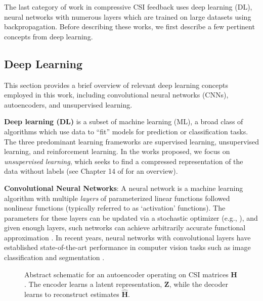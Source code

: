 The last category of work in compressive CSI feedback uses deep learning (DL), neural networks with numerous layers which are trained on large datasets using backpropagation. Before describing these works, we first describe a few pertinent concepts from deep learning.

\subsection{Deep Learning}
\label{sect:dl_overview}

This section provides a brief overview of relevant deep learning concepts employed in this work, including convolutional neural networks (CNNs), autoencoders, and unsupervised learning.

\textbf{Deep learning (DL)} is a subset of machine learning (ML), a broad class of algorithms which use data to ``fit'' models for prediction or classification tasks. The three predominant learning frameworks are supervised learning, unsupervised learning, and reinforcement learning. In the works proposed, we focus on \emph{unsupervised learning}, which seeks to find a compressed representation of the data without labels (see Chapter 14 of \cite{ref:Hastie2016Elements} for an overview).

\textbf{Convolutional Neural Networks}: A neural network is a machine learning algorithm with multiple \emph{layers} of parameterized linear functions followed nonlinear functions (typically referred to as `activation' functions). The parameters for these layers can be updated via a stochastic optimizer (e.g., \cite{ref:Kingma2014ADAM}), and given enough layers, such networks can achieve arbitrarily accurate functional approximation \cite{ref:Hecht1992TheoryBackprop}. In recent years, neural networks with convolutional layers have established state-of-the-art performance in computer vision tasks such as image classification \cite{ref:Sabour2017Dynamic} and segmentation \cite{ref:He2017Mask}.

\begin{figure}[!hbtp]
\centering
\def\svgwidth{0.8\columnwidth}

\caption{Abstract schematic for an autoencoder operating on CSI matrices $\mathbf H$. The encoder learns a latent representation, $\mathbf Z$, while the decoder learns to reconstruct estimates $\hat{\mathbf H}$.}
\label{fig:autoencoder_schematic}
\end{figure}

